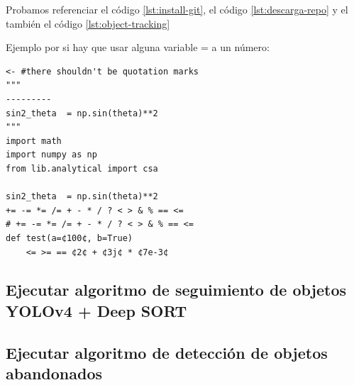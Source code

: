 Probamos referenciar el código \ref{lst:install-git}, el código \ref{lst:descarga-repo} y el también el código \ref{lst:object-tracking}

Ejemplo por si hay que usar alguna variable = a un número:

\begin{lstlisting}[language=iPython]
<- #there shouldn't be quotation marks
"""
---------
sin2_theta  = np.sin(theta)**2
"""
import math
import numpy as np
from lib.analytical import csa

sin2_theta  = np.sin(theta)**2
+= -= *= /= + - * / ? < > & % == <=
# += -= *= /= + - * / ? < > & % == <=
def test(a=¢100¢, b=True)
    <= >= == ¢2¢ + ¢3j¢ * ¢7e-3¢
\end{lstlisting}

\newpage

\subsection{Ejecutar algoritmo de seguimiento de objetos YOLOv4 + Deep SORT}
\label{subsec:ejecutar-seguimiento-yolov4-deepsort}


\newpage

\subsection{Ejecutar algoritmo de detección de objetos abandonados}
\label{subsec:ejecutar-deteccion-abandoned-object}


